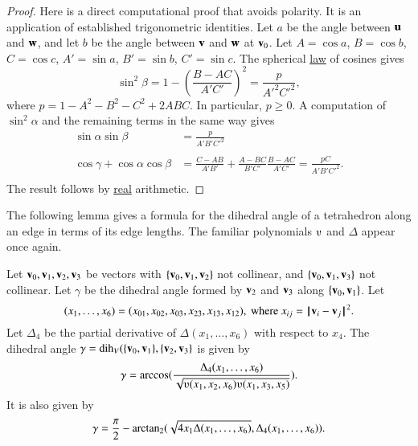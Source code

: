 \begin{proof}  
Here is a direct
computational proof that avoids polarity.  It is an application of established
trigonometric identities.
Let $a$ be the angle between ${\mathbf u}$ and ${\mathbf w}$, and let $b$ be the angle
between ${\mathbf v}$ and ${\mathbf w}$ at ${\mathbf v}_0$.
Let $A=\cos a$, $B=\cos b$, $C=\cos c$,
$A'=\sin a$, $B'=\sin b$, $C'=\sin c$.  The
spherical \hyperref[lemma:sloc]{law} of cosines gives
   $$\sin^2\beta = 1-\left(\frac{B-A C}{A' C'}\right)^2
     = \frac{p}{A'^2 C'^2},$$
where $p=1-A^2 - B^2 - C^2 + 2 A B C$.
In particular, $p\ge 0$.
%
A computation of $\sin^2\alpha$ and the remaining terms in the same way gives
   $$
   \begin{array}{lll}
     \sin\alpha\sin\beta &= \frac{\displaystyle p}{\displaystyle A' B' C'^2}\\ 
      \\
     \cos\gamma + \cos\alpha \cos\beta &=
         \frac{\displaystyle C - A B}{\displaystyle A' B'} + \frac{\displaystyle A - B C}{\displaystyle B' C'} \frac{\displaystyle B - A C}{\displaystyle A' C'}
         = \frac{\displaystyle p C}{\displaystyle A' B' C'^2}.\\
   \end{array}
   $$
The result follows by \hyperref[back:analysis]{real} arithmetic.
\end{proof}

The following lemma gives a formula for the dihedral angle
of a tetrahedron along an edge in terms of its edge lengths.  The
familiar polynomials $\ups$ and $\Delta$ appear once again.
%
%


\begin{lemma} \label{lemma:dihform}
Let ${\mathbf v}_0,{\mathbf v}_1,{\mathbf v}_2,{\mathbf v}_3$ 
be vectors with $\{{\mathbf v}_0,{\mathbf v}_1,{\mathbf v}_2\}$ not collinear, 
and $\{{\mathbf v}_0,{\mathbf v}_1,{\mathbf v}_3\}$ not
collinear. 
Let $\gamma$ be the dihedral angle formed
by ${\mathbf v}_2$ and ${\mathbf v}_3$ along $\{{\mathbf v}_0,{\mathbf v}_1\}$. Let
    $$(x_1,\ldots,x_6) = 
    (x_{01},x_{02},x_{03},x_{23},x_{13},x_{12}),
    \text{ where } x_{ij}={\hskip0.1em|\hskip-0.15em|\hskip0.1em}{\mathbf v}_i - {\mathbf v}_j{\hskip0.1em|\hskip-0.15em|\hskip0.1em}^2.$$
Let $\Delta_4$ be the partial derivative of $\Delta(x_1,\ldots,x_6)$ with
respect to $x_4$.
The dihedral angle $\gamma=\operatorname{dih}_V(\{{\mathbf v}_0,{\mathbf v}_1\},\{{\mathbf v}_2,{\mathbf v}_3\}$
is given by
    $$
    \gamma=\arccos(\frac{\Delta_4(x_1,\ldots,x_6)}{\sqrt{
    \ups(x_1,x_2,x_6)\ups(x_1,x_3,x_5)}}).
    $$
It is also given by
    $$
    \gamma=\frac{\pi}{2} - {\operatorname{arctan_2}}
     ({\sqrt{4 x_1 \Delta(x_1,\ldots,x_6)}},{\Delta_4(x_1,\ldots,x_6)}).
    $$
\end{lemma}
%


